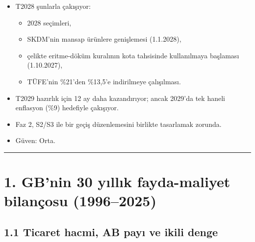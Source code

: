 \begin{enumerate}
  \begin{itemize}
  \tightlist
  \item
    T2028 şunlarla çakışıyor:

    \begin{itemize}
    \tightlist
    \item
      2028 seçimleri,
    \item
      SKDM'nin mansap ürünlere genişlemesi (1.1.2028),
    \item
      çelikte eritme-döküm kuralının kota tahsisinde kullanılmaya başlaması (1.10.2027),
    \item
      TÜFE'nin \%21'den \%13,5'e indirilmeye çalışılması.
    \end{itemize}
  \item
    T2029 hazırlık için 12 ay daha kazandırıyor; ancak 2029'da tek haneli enflasyon (\%9) hedefiyle çakışıyor.
  \item
    Faz 2, S2/S3 ile bir geçiş düzenlemesini birlikte tasarlamak zorunda.
  \item
    \etiketH{} Güven: Orta.
  \end{itemize}
\end{enumerate}

\begin{center}\rule{0.5\linewidth}{0.5pt}\end{center}

\hypertarget{01_teshis-1-gbnin-30-yux131llux131k-fayda-maliyet-bilanuxe7osu-19962025}{%
\section{1. GB'nin 30 yıllık fayda-maliyet bilançosu (1996--2025)}\label{01_teshis-1-gbnin-30-yux131llux131k-fayda-maliyet-bilanuxe7osu-19962025}}

\hypertarget{01_teshis-11-ticaret-hacmi-ab-payux131-ve-ikili-denge}{%
\subsection{1.1 Ticaret hacmi, AB payı ve ikili denge}\label{01_teshis-11-ticaret-hacmi-ab-payux131-ve-ikili-denge}}

